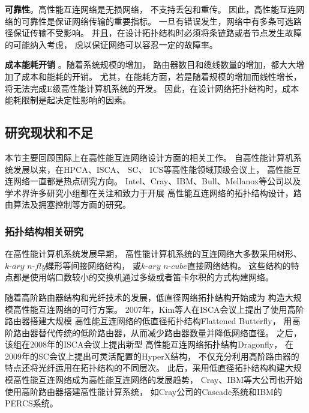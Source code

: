\textbf{可靠性}。高性能互连网络是无损网络，
不支持丢包和重传。
因此，高性能互连网络的可靠性是保证网络传输的重要指标。
一旦有错误发生，网络中有多条可选路径保证传输不受影响。
并且，在设计拓扑结构时必须将条链路或者节点发生故障的可能纳入考虑，
虑以保证网络可以容忍一定的故障率。

\textbf{成本能耗开销} 。随着系统规模的增加，
路由器数目和缆线数量的增加，都大大增加了成本和能耗的开销。
尤其，在能耗方面，若是随着规模的增加而线性增长，
将无法完成E级高性能计算机系统的开发。
因此，在设计网络拓扑结构时，成本能耗限制是起决定性影响的因素。

\subsection{研究现状和不足}

本节主要回顾国际上在高性能互连网络设计方面的相关工作。
自高性能计算机系统发展以来，在HPCA、ISCA、 SC、 ICS等高性能领域顶级会议上，
高性能互连网络一直都是热点研究方向。
Intel、Cray、IBM、Bull、Mellanox等公司以及
学术界许多研究小组都在关注和致力于开展
高性能互连网络的拓扑结构设计，路由算法及拥塞控制等方面的研究。

\subsubsection{拓扑结构相关研究}
在高性能计算机系统发展早期，
高性能计算机系统的互连网络大多数采用树形、
$k\textrm{-}ary$ $n\textrm{-}fly$蝶形等间接网络结构，
或$k\textrm{-}ary$ $n\textrm{-}cube$直接网络结构。
这些结构的特点都是使用端口数较小的交换机通过多级或者笛卡尔积的方式构建网络。

随着高阶路由器结构和光纤技术的发展，低直径网络拓扑结构开始成为
构造大规模高性能互连网络的可行方案。
2007年，Kim等人在ISCA会议上提出了使用高阶路由器搭建大规模
高性能互连网络的低直径拓扑结构Flattened Butterfly，
用高阶路由器替代传统的低阶路由器，从而减少路由器数量并降低网络直径。
之后，该组在2008年的ISCA会议上提出新型
高性能互连网络拓扑结构Dragonfly，
在2009年的SC会议上提出可灵活配置的HyperX结构，
不仅充分利用高阶路由器的特点还将光纤运用在拓扑结构的不同层次。
此后，采用低直径拓扑结构构建大规模高性能互连网络成为高性能互连网络的发展趋势，
Cray、IBM等大公司也开始使用高阶路由器搭建高性能计算系统，
如Cray公司的Cascade系统和IBM的PERCS系统。

